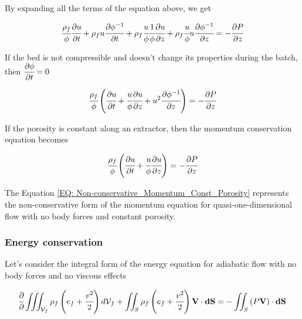 \documentclass[../Article_Sensitivity_Analsysis.tex]{subfiles}
\begin{document}
	By expanding all the terms of the equation above, we get
	
	{\footnotesize
		\begin{equation}
			\cfrac{\rho_f}{\phi} \cfrac{\partial u}{\partial t} + \rho_f u \cfrac{\partial \phi^{-1}}{\partial t} + \rho_f \cfrac{u}{\phi} \cfrac{1}{\phi} \cfrac{\partial u}{\partial z} + \rho_f \cfrac{u}{\phi} u \cfrac{\partial \phi^{-1} }{\partial z} = - \cfrac{\partial P}{\partial z}
		\end{equation}
	}
	
	If the bed is not compressible and doesn't change its properties during the batch, then ${\footnotesize\cfrac{\partial \phi}{\partial t}=0}$
	
	{\footnotesize
		\begin{equation}
			\cfrac{\rho_f}{\phi} \left( \cfrac{\partial u}{\partial t} + \cfrac{u}{\phi} \cfrac{\partial u}{\partial z} + u^2 \cfrac{\partial \phi^{-1}}{\partial z} \right) = -\cfrac{\partial P}{\partial z}
		\end{equation}
	}

	If the porosity is constant along an extractor, then the momentum conservation equation becomes
	
	{\footnotesize
		\begin{equation}
			\cfrac{\rho_f}{\phi} \left( \cfrac{\partial u}{\partial t} + \cfrac{u}{\phi} \cfrac{\partial u}{\partial z} \right) = -\cfrac{\partial P}{\partial z}
			\label{EQ: Non-conservative_Momentum_Const_Porosity}
		\end{equation}
	}

	The Equation \ref{EQ: Non-conservative_Momentum_Const_Porosity} represents the non-conservative form of the momentum equation for quasi-one-dimensional flow with no body forces and constant porosity.
	
	\subsubsection{Energy conservation}
	
	Let's consider the integral form of the energy equation for adiabatic flow with no body forces and no viscous effects
	
	{\footnotesize
		\begin{equation}
			\cfrac{\partial}{\partial} \iiint_{\mathcal{V}_f} \rho_f \left( e_f + \cfrac{v^2}{2} \right) d\mathcal{V}_f + \iint_S \rho_f \left( e_f + \cfrac{v^2}{2} \right) \textbf{V} \cdot \textbf{dS} = - \iint_S \left( P\textbf{V} \right) \cdot \textbf{dS}
			\label{EQ: Energy_equation_integral}
		\end{equation}
	}
\end{document}
